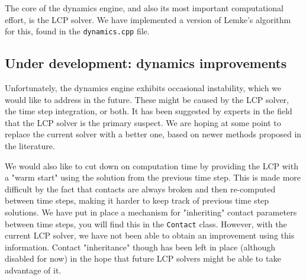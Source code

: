 The core of the dynamics engine, and also its most important
computational effort, is the LCP solver. We have implemented a version
of Lemke's algorithm for this, found in the \texttt{dynamics.cpp}
file.

\subsection{Under development: dynamics improvements}

Unfortunately, the dynamics engine exhibits occasional instability,
which we would like to address in the future. These might be caused by
the LCP solver, the time step integration, or both. It has been
suggested by experts in the field that the LCP solver is the primary
suspect. We are hoping at some point to replace the current solver
with a better one, based on newer methods proposed in the literature.

We would also like to cut down on computation time by providing the
LCP with a "warm start" using the solution from the previous time
step. This is made more difficult by the fact that contacts are always
broken and then re-computed between time steps, making it harder to
keep track of previous time step solutions. We have put in place a
mechanism for "inheriting" contact parameters between time steps, you
will find this in the \texttt{Contact} class. However, with the
current LCP solver, we have not been able to obtain an improvement
using this information. Contact "inheritance" though has been left in
place (although disabled for now) in the hope that future LCP solvers
might be able to take advantage of it.
